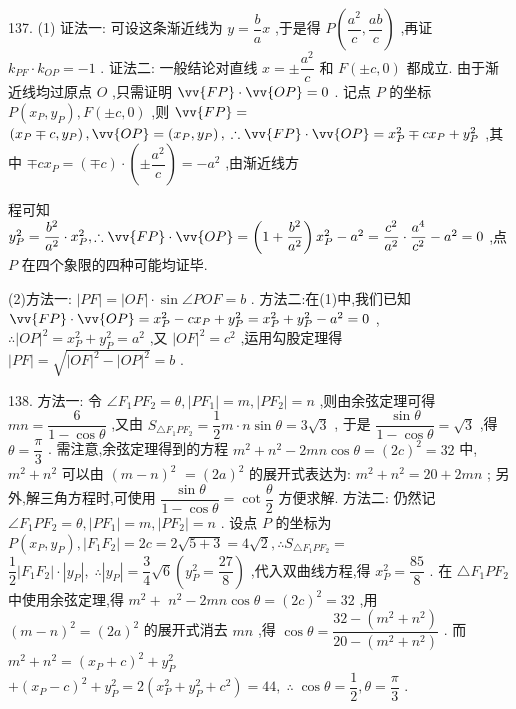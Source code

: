 137. (1) 证法一: 可设这条渐近线为 $y = \dfrac{b}{a}x$ ,于是得 $P\left( {\dfrac{{a}^{2}}{c},\dfrac{ab}{c}}\right)$ ,再证 ${k}_{PF} \cdot  {k}_{OP} =  - 1$ . 证法二: 一般结论对直线 $x =  \pm  \dfrac{{a}^{2}}{c}$ 和 $F\left( {\pm c,0}\right)$ 都成立. 由于渐近线均过原点 $O$ ,只需证明 $\vv{FP} \cdot  \vv{OP} = 0$ . 记点 $P$ 的坐标 $P\left( {{x}_{P},{y}_{P}}\right) ,F\left( {\pm c,0}\right)$ ,则 $\vv{FP} =$  $\left( {{x}_{P} \mp  c,{y}_{P}}\right) ,\vv{OP} = \left( {{x}_{P},{y}_{P}}\right) ,\;\therefore \vv{FP} \cdot  \vv{OP} = {x}_{P}^{2} \mp  c{x}_{P} + {y}_{P}^{2}$ ,其中 $\mp  c{x}_{P} = \left( {\mp c}\right)  \cdot  \left( {\pm \dfrac{{a}^{2}}{c}}\right)  =  - {a}^{2}$ ,由渐近线方

程可知 ${y}_{P}^{2} = \dfrac{{b}^{2}}{{a}^{2}} \cdot  {x}_{P}^{2},\therefore \vv{FP} \cdot  \vv{OP} = \left( {1 + \dfrac{{b}^{2}}{{a}^{2}}}\right) {x}_{P}^{2} - {a}^{2} = \dfrac{{c}^{2}}{{a}^{2}} \cdot  \dfrac{{a}^{4}}{{c}^{2}} - {a}^{2} = 0$ ,点 $P$ 在四个象限的四种可能均证毕.

(2)方法一: $\left| {PF}\right|  = \left| {OF}\right|  \cdot  \sin \angle {POF} = b$ . 方法二:在(1)中,我们已知 $\vv{FP} \cdot  \vv{OP} = {x}_{P}^{2} - c{x}_{P} + {y}_{P}^{2} = {x}_{P}^{2} + {y}_{P}^{2} - {a}^{2} = 0$ , $\therefore {\left| OP\right| }^{2} = {x}_{P}^{2} + {y}_{P}^{2} = {a}^{2}$ ,又 ${\left| OF\right| }^{2} = {c}^{2}$ ,运用勾股定理得 $\left| {PF}\right|  = \sqrt{{\left| OF\right| }^{2} - {\left| OP\right| }^{2}} = b$ .

138. 方法一: 令 $\angle {F}_{1}P{F}_{2} = \theta ,\left| {P{F}_{1}}\right|  = m,\left| {P{F}_{2}}\right|  = n$ ,则由余弦定理可得 ${mn} = \dfrac{6}{1 - \cos \theta }$ ,又由 ${S}_{\bigtriangleup {F}_{1}P{F}_{2}} = \dfrac{1}{2}m \cdot  n\sin \theta  = 3\sqrt{3}$ , 于是 $\dfrac{\sin \theta }{1 - \cos \theta } = \sqrt{3}$ ,得 $\theta  = \dfrac{\pi }{3}$ . 需注意,余弦定理得到的方程 ${m}^{2} + {n}^{2} - {2mn}\cos \theta  = {\left( 2c\right) }^{2} = {32}$ 中, ${m}^{2} + {n}^{2}$ 可以由 ${\left( m - n\right) }^{2}$  $= {\left( 2a\right) }^{2}$ 的展开式表达为: ${m}^{2} + {n}^{2} = {20} + {2mn}$ ; 另外,解三角方程时,可使用 $\dfrac{\sin \theta }{1 - \cos \theta } = \cot \dfrac{\theta }{2}$ 方便求解. 方法二: 仍然记 $\angle {F}_{1}P{F}_{2} = \theta ,\left| {P{F}_{1}}\right|  = m,\left| {P{F}_{2}}\right|  = n$ . 设点 $P$ 的坐标为 $P\left( {{x}_{P},{y}_{P}}\right) ,\left| {{F}_{1}{F}_{2}}\right|  = {2c} = 2\sqrt{5 + 3} = 4\sqrt{2},\therefore {S}_{\bigtriangleup {F}_{1}P{F}_{2}} =$  $\dfrac{1}{2}\left| {{F}_{1}{F}_{2}}\right|  \cdot  \left| {y}_{P}\right| ,\;\therefore \left| {y}_{P}\right|  = \dfrac{3}{4}\sqrt{6}\left( {{y}_{P}^{2} = \dfrac{27}{8}}\right)$ ,代入双曲线方程,得 ${x}_{P}^{2} = \dfrac{85}{8}$ . 在 $\bigtriangleup {F}_{1}P{F}_{2}$ 中使用余弦定理,得 ${m}^{2} +$  ${n}^{2} - {2mn}\cos \theta  = {\left( 2c\right) }^{2} = {32}$ ,用 ${\left( m - n\right) }^{2} = {\left( 2a\right) }^{2}$ 的展开式消去 ${mn}$ ,得 $\cos \theta  = \dfrac{{32} - \left( {{m}^{2} + {n}^{2}}\right) }{{20} - \left( {{m}^{2} + {n}^{2}}\right) }$ . 而 ${m}^{2} + {n}^{2} = {\left( {x}_{P} + c\right) }^{2} + {y}_{P}^{2}$  $+ {\left( {x}_{P} - c\right) }^{2} + {y}_{P}^{2} = 2\left( {{x}_{P}^{2} + {y}_{P}^{2} + {c}^{2}}\right)  = {44},\;\therefore \;\cos \theta  = \dfrac{1}{2},\theta  = \dfrac{\pi }{3}$ .

